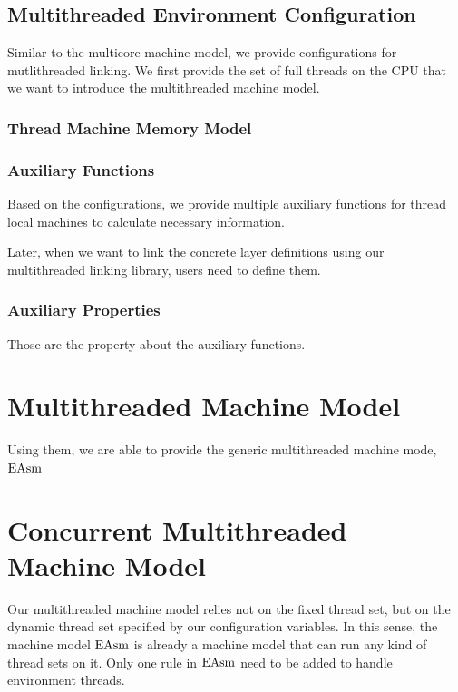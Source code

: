 \subsection{Multithreaded Environment Configuration}
\label{chapter:linking:subsec:multithreaded-env-configuration}

Similar to the multicore machine model, we provide configurations 
for mutlithreaded linking. 
We first provide the set of full threads on the CPU that we want to introduce the multithreaded machine model. 

\subsubsection{Thread Machine Memory Model}


\subsubsection{Auxiliary Functions}

Based on the configurations, we provide multiple auxiliary functions 
for thread local machines to calculate necessary information. 

Later, when we want to link the concrete layer definitions using our multithreaded linking library, users need to define them.

\subsubsection{Auxiliary Properties}

Those are the property about the auxiliary functions. 

\section{Multithreaded Machine Model}
\label{chapter:linking:subsec:multithreaded-machine-model}

Using them, we are able to provide the generic multithreaded machine mode, $\mathrm{EAsm}$

\section{Concurrent Multithreaded Machine Model}
\label{chapter:linking:subsec:concurrent-multithreaded-machine-model}

Our multithreaded machine model relies not on the fixed thread set, but on 
the dynamic thread set specified by our configuration variables.
In this sense, the machine model $\mathrm{EAsm}$ is already a machine model that can run 
any kind of thread sets on it. 
Only one rule in $\mathrm{EAsm}$ need to be added to handle environment threads. 


